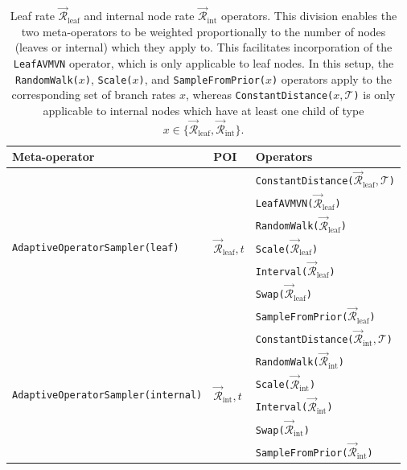 \documentclass[10pt,letterpaper]{article}
\begin{document}
\begin{table}[h!]
\centering
\begin{tabular}{l l l} 
 Meta-operator & POI & Operators \\
\hline
 \multirow{7}{*}{\texttt{AdaptiveOperatorSampler(leaf)}} & \multirow{7}{*}{$\vec{\mathcal{R}}^{\,}_\text{leaf}, t$} & \texttt{ConstantDistance($\vec{\mathcal{R}}^{\,}_\text{leaf}, \mathcal{T}$)}   \\ 
&& \texttt{LeafAVMVN($\vec{\mathcal{R}}^{\,}_\text{leaf}$)}  \\
&& \texttt{RandomWalk($\vec{\mathcal{R}}^{\,}_\text{leaf}$)}  \\
&& \texttt{Scale($\vec{\mathcal{R}}^{\,}_\text{leaf}$)}   \\
&& \texttt{Interval($\vec{\mathcal{R}}^{\,}_\text{leaf}$)}   \\
&& \texttt{Swap($\vec{\mathcal{R}}^{\,}_\text{leaf}$)}  \\
&& \texttt{SampleFromPrior($\vec{\mathcal{R}}^{\,}_\text{leaf}$)} \\
\hline
 \multirow{6}{*}{\texttt{AdaptiveOperatorSampler(internal)}} & \multirow{6}{*}{$\vec{\mathcal{R}}^{\,}_\text{int}, t$} & \texttt{ConstantDistance($\vec{\mathcal{R}}^{\,}_\text{int}, \mathcal{T}$)}   \\ 
&& \texttt{RandomWalk($\vec{\mathcal{R}}^{\,}_\text{int}$)}  \\
&& \texttt{Scale($\vec{\mathcal{R}}^{\,}_\text{int}$)}   \\
&& \texttt{Interval($\vec{\mathcal{R}}^{\,}_\text{int}$)}   \\
&& \texttt{Swap($\vec{\mathcal{R}}^{\,}_\text{int}$)}  \\
&& \texttt{SampleFromPrior($\vec{\mathcal{R}}^{\,}_\text{int}$)} \\
\end{tabular}
\caption{Leaf rate $\vec{\mathcal{R}}^{\,}_\text{leaf}$ and internal node rate $\vec{\mathcal{R}}^{\,}_\text{int}$ operators. 
This division enables the two meta-operators to be weighted proportionally to the number of nodes (leaves or internal) which they apply to.
This facilitates incorporation of the  \texttt{LeafAVMVN} operator, which is only applicable to leaf nodes.
In this setup, the \texttt{RandomWalk($x$)}, \texttt{Scale($x$)}, and \texttt{SampleFromPrior($x$)} operators apply to the corresponding set of branch rates $x$, whereas \texttt{ConstantDistance($x, \mathcal{T}$)} is only applicable to internal nodes which have at least one child of type $x \in \{\vec{\mathcal{R}}^{\,}_\text{leaf}, \vec{\mathcal{R}}^{\,}_\text{int}\}$.}
\label{table:AVMVNoperators}
\end{table}
\end{document}
